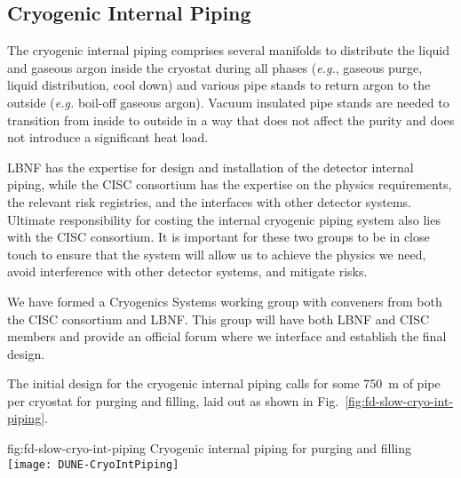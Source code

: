 \subsection{Cryogenic Internal Piping}
\label{sec:fdsp-slow-cryo-int-piping}


The cryogenic internal piping comprises several manifolds to
distribute the liquid and gaseous argon inside the cryostat during all
phases ({\em e.g.}, gaseous purge, liquid distribution, cool down) and
various pipe stands to return argon to the outside ({\em e.g.}
boil-off gaseous argon).  Vacuum insulated pipe stands are needed to
transition from inside to outside in a way that does not affect the
purity and does not introduce a significant heat load.

LBNF has the expertise for design and installation of the detector
internal piping, while the CISC consortium has the expertise on the
physics requirements, the relevant risk registries, and the interfaces
with other detector systems. Ultimate responsibility for costing the
internal cryogenic piping system also lies with the CISC
consortium. It is important for these two groups to be in close touch
to ensure that the system will allow us to achieve the physics we
need, avoid interference with other detector systems, and mitigate
risks.

We have formed a Cryogenics Systems working group with conveners from
both the CISC consortium and LBNF. This group will have both LBNF and
CISC members and provide an official forum where we interface and
establish the final design.

The initial design for the cryogenic internal piping calls for some
\SI{750}{m} of pipe per cryostat for purging and filling, laid out as
shown in Fig.~\ref{fig:fd-slow-cryo-int-piping}.

  \begin{dunefigure}{fig:fd-slow-cryo-int-piping}
  {Cryogenic internal piping for purging and filling}
  \texttt{[image: DUNE-CryoIntPiping]}%
\end{dunefigure}



